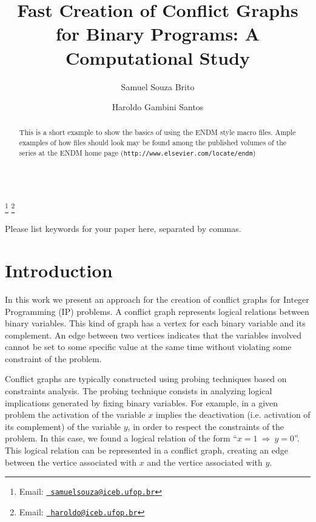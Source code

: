 \documentclass{endm}
\begin{document}
  

\begin{verbatim}\end{verbatim}\vspace{2.5cm}

\begin{frontmatter}

\title{Fast Creation of Conflict Graphs for Binary Programs: A Computational Study}

\author{Samuel Souza Brito \and Haroldo Gambini Santos}
 
\address{Computing Department\\ Universidade Federal de Ouro Preto - UFOP\\ Ouro Preto, Brazil}
\thanks[myemail]{Email:
   \href{mailto:samuelsouza@iceb.ufop.br} {\texttt{\normalshape
   samuelsouza@iceb.ufop.br}}} \thanks[coemail]{Email:
   \href{mailto:haroldo@iceb.ufop.br} {\texttt{\normalshape
   haroldo@iceb.ufop.br}}}

\begin{abstract}
This is a short example to show the basics of using the ENDM style
macro files. Ample examples of how files should look may be found
among the published volumes of the series at the ENDM home page
({\texttt{http://www.elsevier.com/locate/endm}})
\end{abstract}

\begin{keyword}
Please list keywords for your paper here, separated by commas.
\end{keyword}

\end{frontmatter}


\section{Introduction}\label{intro}

In this work we present an approach for the creation of conflict graphs for Integer Programming (IP) problems. A conflict graph represents logical relations between binary variables. This kind of graph has a vertex for each binary variable and its complement. An edge between two vertices indicates that the variables involved cannot be set to some specific value at the same time without violating some constraint of the problem.

Conflict graphs are typically constructed using probing techniques \cite{Borndorfer1998} based on constraints analysis. The probing technique consists in analyzing logical implications generated by fixing binary variables. For example, in a given problem the activation of the variable $x$ implies the deactivation (i.e. activation of its complement) of the variable $y$, in order to respect the constraints of the problem. In this case, we found a logical relation of the form ``$x = 1 \ \Rightarrow \ y = 0$''. This logical relation can be represented in a conflict graph, creating an edge between the vertice associated with $x$ and the vertice associated with $y$.
\end{document}
